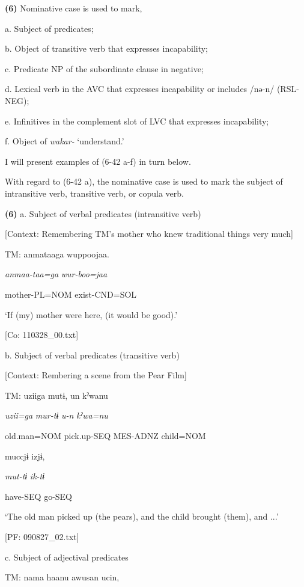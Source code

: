 \textbf{(6)}  Nominative case is used to mark,

  a. Subject of predicates;

  b. Object of transitive verb that expresses incapability;

  c. Predicate NP of the subordinate clause in negative;

  d. Lexical verb in the AVC that expresses incapability or includes /nə-n/ (RSL-NEG);

  e. Infinitives in the complement slot of LVC that expresses incapability;

  f. Object of \textit{wakar-} ‘understand.’

I will present examples of (6-42 a-f) in turn below.

With regard to (6-42 a), the nominative case is used to mark the subject of intransitive verb, transitive verb, or copula verb.

\textbf{(6)}  a.  Subject of verbal predicates (intransitive verb)

    [Context: Remembering TM’s mother who knew traditional things very much]

    TM:  anmataaga  wuppoojaa.

      \textit{anmaa-taa=ga}  \textit{wur-boo=jaa}

      mother-PL=NOM  exist-CND=SOL

      ‘If (my) mother were here, (it would be good).’

      [Co: 110328\_00.txt]

  b.  Subject of verbal predicates (transitive verb)

    [Context: Rembering a scene from the Pear Film]

    TM:  uziiga  mutɨ,  un  kˀwanu

      \textit{uzii=ga}  \textit{mur-tɨ}  \textit{u-n}  \textit{kˀwa=nu}

      old.man=NOM  pick.up-SEQ  MES-ADNZ  child=NOM

      muccjɨ  izjɨ,

      \textit{mut-tɨ}  \textit{ik-tɨ}

      have-SEQ  go-SEQ

      ‘The old man picked up (the pears), and the child brought (them), and ...’

      [PF: 090827\_02.txt]

  c.  Subject of adjectival predicates

    TM:  nama  haanu  awusan  ucin,

